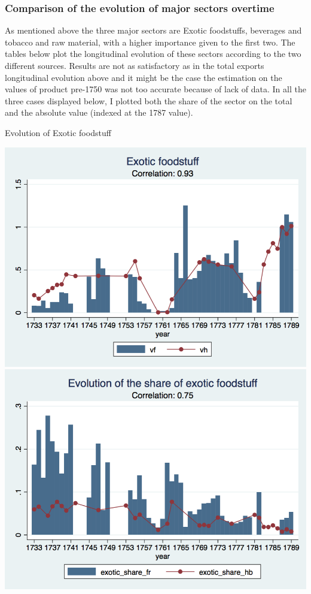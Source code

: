 \documentclass[12pt,a4paper,titlepage]{article}
\begin{document}
\subsubsection{Comparison of the evolution of major sectors overtime}
As mentioned above the three major sectors are Exotic foodstuffs, beverages and tobacco and raw material, with a higher importance given to the first two. The tables below plot the longitudinal evolution of these sectors according to the two different sources. Results are not as satisfactory as in the total exports longitudinal evolution above and it might be the case the estimation on the values of product pre-1750 was not too accurate because of lack of data. In all the three cases displayed below, I plotted both the share of the sector on the total and the absolute value (indexed at the 1787 value). 
\caption{Evolution of Exotic foodstuff}
\includegraphics[scale=.28]{exotic_food_long.png}
\includegraphics[scale=.28]{exotic_food_share.png}\\
\end{document}
